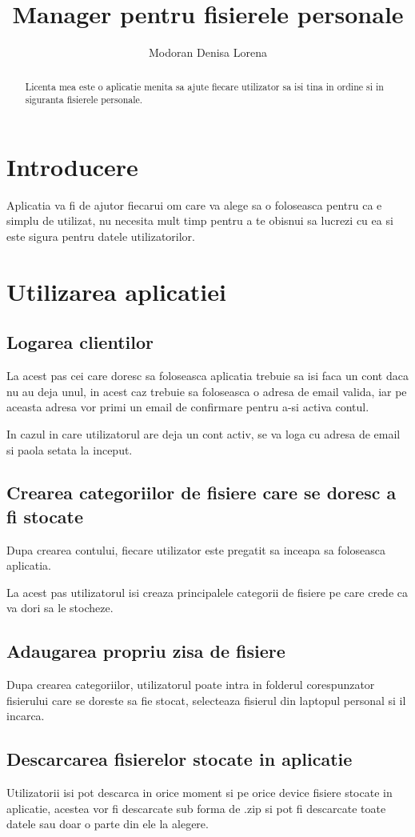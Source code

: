 \documentclass[a4paper]{article}
\title{Manager pentru fisierele personale}
\author{Modoran Denisa Lorena}
\begin{document}
\maketitle

\begin{abstract}
Licenta mea este o aplicatie menita sa ajute fiecare utilizator sa isi tina in ordine si in siguranta fisierele personale.

\end{abstract}

\section{Introducere}

Aplicatia va fi de ajutor fiecarui om care va alege sa o foloseasca pentru ca e simplu de utilizat, nu necesita mult timp pentru a te obisnui sa lucrezi cu ea si este sigura pentru datele utilizatorilor.

\section{Utilizarea aplicatiei}

\subsection{Logarea clientilor}

La acest pas cei care doresc sa foloseasca aplicatia trebuie sa isi faca un cont daca nu au deja unul, in acest caz trebuie sa foloseasca o adresa de email valida, iar pe aceasta adresa vor primi un email de confirmare pentru a-si activa contul.

In cazul in care utilizatorul are deja un cont activ, se va loga cu adresa de email si paola setata la inceput.


\subsection{Crearea categoriilor de fisiere care se doresc a fi stocate}

Dupa crearea contului, fiecare utilizator este pregatit sa inceapa sa foloseasca aplicatia.

La acest pas utilizatorul isi creaza principalele categorii de fisiere pe care crede ca va dori sa le stocheze.

\subsection{Adaugarea propriu zisa de fisiere}

Dupa crearea categoriilor, utilizatorul poate intra in folderul corespunzator fisierului care se doreste sa fie stocat, selecteaza fisierul din laptopul personal si il incarca.

\subsection{Descarcarea fisierelor stocate in aplicatie}

Utilizatorii isi pot descarca in orice moment si pe orice device fisiere stocate in aplicatie, acestea vor fi descarcate sub forma de .zip si pot fi descarcate toate datele sau doar o parte din ele la alegere.
\end{document}
